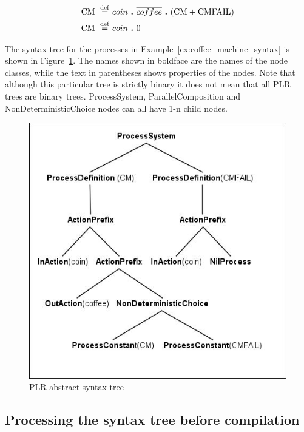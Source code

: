 	\begin{Exa}
	\label{ex:coffee_machine_syntax}
	\begin{align*}
			\mathrm{CM} \ \stackrel{\mathrm{def}}{=}\  & coin \ \textbf{.}\  \overline{coffee} \ \textbf{.}\  (\mathrm{CM}+\mathrm{CMFAIL})\\
			\mathrm{CM} \ \stackrel{\mathrm{def}}{=}\  & coin \ \textbf{.}\  \mathrm{0}
	\end{align*}	
	\end{Exa}

	The syntax tree for the processes in Example~\ref{ex:coffee_machine_syntax} 
	is shown in Figure~\ref{fig:syntax_tree_example}. The names shown in 
	boldface are the names of the node classes, while the text in 
	parentheses shows properties of the nodes. Note that although this 
	particular tree is strictly binary it does not mean that all PLR trees
	are binary trees. \textsf{ProcessSystem}, \textsf{ParallelComposition} and 
	\textsf{NonDeterministicChoice} nodes can all have 1-n child nodes.
	
	
	\begin{figure}[h!]
		\centering
		\includegraphics[scale=0.7]{syntax_tree_example.jpg}
		\caption{PLR abstract syntax tree}
		\label{fig:syntax_tree_example}
	\end{figure}
 	

\subsection{Processing the syntax tree before compilation}\label{sec:visitor}
	
